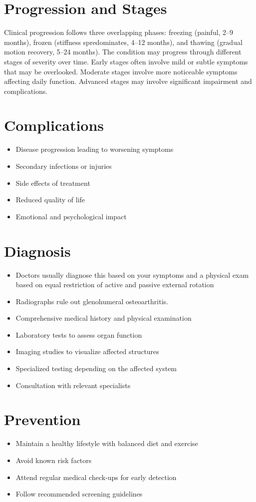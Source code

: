 \section{Progression and Stages}
Clinical progression follows three overlapping phases: freezing (painful, 2--9 months), frozen (stiffness spredominates, 4--12 months), and thawing (gradual motion recovery, 5--24 months). The condition may progress through different stages of severity over time. Early stages often involve mild or subtle symptoms that may be overlooked. Moderate stages involve more noticeable symptoms affecting daily function. Advanced stages may involve significant impairment and complications.
\section{Complications}
\begin{itemize}[noitemsep]
  \item Disease progression leading to worsening symptoms
  \item Secondary infections or injuries
  \item Side effects of treatment
  \item Reduced quality of life
  \item Emotional and psychological impact
\end{itemize}
\section{Diagnosis}
\begin{itemize}[noitemsep]
  \item Doctors usually diagnose this based on your symptoms and a physical exam based on equal restriction of active and passive external rotation
  \item Radiographs rule out glenohumeral osteoarthritis.
  \item Comprehensive medical history and physical examination
  \item Laboratory tests to assess organ function
  \item Imaging studies to visualize affected structures
  \item Specialized testing depending on the affected system
  \item Consultation with relevant specialists
\end{itemize}
\section{Prevention}
\begin{itemize}[noitemsep]
  \item Maintain a healthy lifestyle with balanced diet and exercise
  \item Avoid known risk factors
  \item Attend regular medical check-ups for early detection
  \item Follow recommended screening guidelines
\end{itemize}
